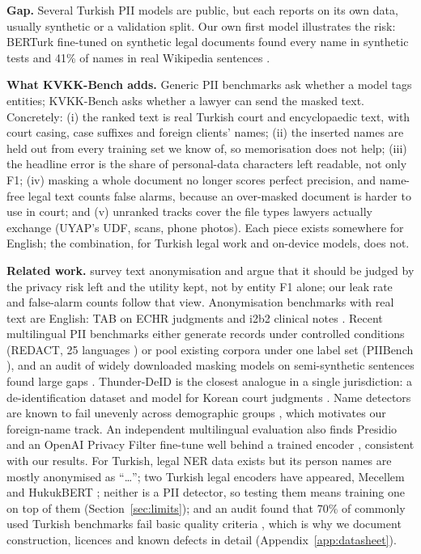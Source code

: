 \documentclass[10pt,twocolumn]{article}
\begin{document}
\textbf{Gap.} Several Turkish PII models are public, but each reports on its own data, usually synthetic or a
validation split. Our own first model illustrates the risk: BERTurk fine-tuned on synthetic legal documents found
every name in synthetic tests and 41\% of names in real Wikipedia sentences \citep{katip-repo}.

\textbf{What KVKK-Bench adds.} Generic PII benchmarks ask whether a model tags entities; KVKK-Bench asks whether a
lawyer can send the masked text. Concretely: (i) the ranked text is real Turkish court and encyclopaedic text, with
court casing, case suffixes and foreign clients' names; (ii) the inserted names are held out from every training set we
know of, so memorisation does not help; (iii) the headline error is the share of personal-data characters left
readable, not only F1; (iv) masking a whole document no longer scores perfect precision, and name-free legal text
counts false alarms, because an over-masked document is harder to use in court; and (v) unranked tracks cover the
file types lawyers actually exchange (UYAP's UDF, scans, phone photos). Each piece exists somewhere for English;
the combination, for Turkish legal work and on-device models, does not.

\textbf{Related work.} \citet{lison2021anonymisation} survey text anonymisation and argue that it should be judged by the privacy risk left and the utility kept, not by entity F1 alone; our leak rate and false-alarm counts follow that view. Anonymisation benchmarks with real text are English: TAB on ECHR judgments
\citep{pilan2022tab} and i2b2 clinical notes \citep{stubbs2015i2b2}. Recent multilingual PII benchmarks either
generate records under controlled conditions (REDACT, 25 languages \citep{vats2026redact}) or pool existing
corpora under one label set (PIIBench \citep{jha2026piibench}), and an audit of widely downloaded masking models
on semi-synthetic sentences found large gaps \citep{singh2025unmasking}.
Thunder-DeID is the closest analogue in a single jurisdiction: a de-identification dataset and model for Korean
court judgments \citep{hahm2025thunder}. Name detectors are known to fail unevenly across demographic groups
\citep{mansfield2022behind}, which motivates our foreign-name track. An independent multilingual evaluation also finds
Presidio and an OpenAI Privacy Filter fine-tune well behind a trained encoder \citep{graehl2026privacytagging},
consistent with our results. For Turkish, legal NER data exists \citep{cetindag2022tlner} but its person names
are mostly anonymised as ``\ldots''; two Turkish legal encoders have appeared, Mecellem \citep{ugur2026mecellem} and HukukBERT
\citep{ozturk2026hukukbert}; neither is a PII detector, so testing them means training one on top of them
(Section~\ref{sec:limits}); and an audit found that 70\% of
commonly used Turkish benchmarks fail basic quality criteria \citep{cengiz2025turkishbench}, which is why we
document construction, licences and known defects in detail (Appendix~\ref{app:datasheet}).
\end{document}
